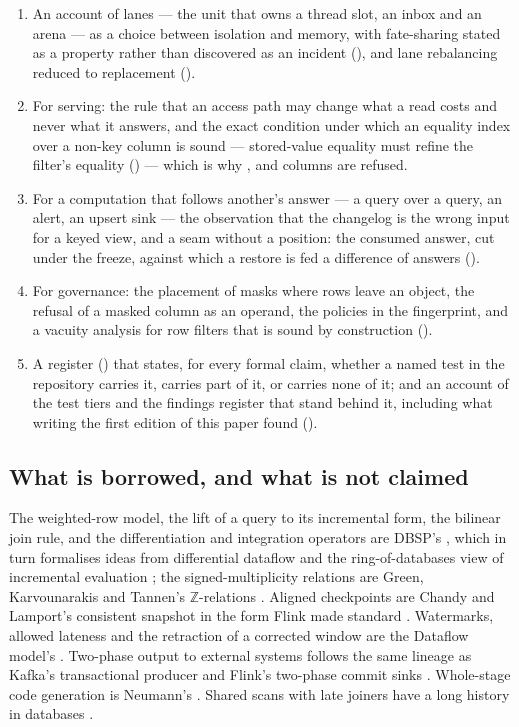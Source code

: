 \documentclass[11pt,a4paper]{article}
\renewcommand{\_}{\oldunderscore\allowbreak}
\newcommand{\Z}{\mathbb{Z}}
\newcommand{\code}[1]{\texttt{\pvbreakable{#1}}}
\begin{document}
\begin{enumerate}[leftmargin=*,itemsep=3pt]
      ().
\item An account of lanes --- the unit that owns a thread slot, an inbox and an arena --- as a choice
      between isolation and memory, with fate-sharing stated as a property rather than discovered as
      an incident (), and lane rebalancing reduced to replacement
      ().
\item For serving: the rule that an access path may change what a read costs and never what it
      answers, and the exact condition under which an equality index over a non-key column is sound
      --- stored-value equality must refine the filter's equality () --- which
      is why \code{FLOAT}, \code{DECIMAL} and \code{BYTES} columns are refused.
\item For a computation that follows another's answer --- a query over a query, an alert, an upsert
      sink --- the observation that the changelog is the wrong input for a keyed view, and a seam
      without a position: the consumed answer, cut under the freeze, against which a restore is fed a
      difference of answers ().
\item For governance: the placement of masks where rows leave an object, the refusal of a masked column
      as an operand, the policies in the fingerprint, and a vacuity analysis for row filters that is
      sound by construction ().
\item A register () that states, for every formal claim, whether a named test in
      the repository carries it, carries part of it, or carries none of it; and an account of the test
      tiers and the findings register that stand behind it, including what writing the first edition of
      this paper found ().
\end{enumerate}

\subsection{What is borrowed, and what is not claimed}

The weighted-row model, the lift of a query to its incremental form, the bilinear join rule, and the
differentiation and integration operators are DBSP's \cite{dbsp2023}, which in turn formalises ideas
from differential dataflow \cite{mcsherry2013} and the ring-of-databases view of incremental
evaluation \cite{koch2010}; the signed-multiplicity relations are Green, Karvounarakis and Tannen's
$\Z$-relations \cite{green2007,green2009}. Aligned checkpoints are Chandy and Lamport's consistent
snapshot \cite{chandy1985} in the form Flink made standard \cite{carbone2015abs,carbone2017}.
Watermarks, allowed lateness and the retraction of a corrected window are the Dataflow model's
\cite{akidau2013,akidau2015}. Two-phase output to external systems follows the same lineage as
Kafka's transactional producer and Flink's two-phase commit sinks \cite{wang2021}. Whole-stage code
generation is Neumann's \cite{neumann2011}. Shared scans with late joiners have a long history in
databases \cite{harizopoulos2005,zukowski2007}.
\end{document}
